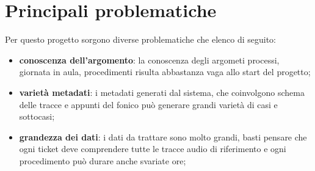 \section{Principali problematiche}
Per questo progetto sorgono diverse problematiche che elenco di seguito:
\begin{itemize}
  \item \textbf{conoscenza dell'argomento}: la conoscenza degli argometi processi, giornata in aula, procedimenti risulta abbastanza vaga allo start del progetto;
  \item \textbf{varietà metadati}: i metadati generati dal sistema, che coinvolgono schema delle tracce e appunti del fonico può generare grandi varietà di casi e sottocasi;
  \item \textbf{grandezza dei dati}: i dati da trattare sono molto grandi, basti pensare che ogni ticket deve comprendere tutte le tracce audio di riferimento e ogni procedimento può durare anche svariate ore;
\end{itemize}

